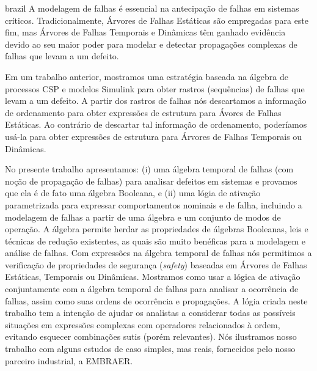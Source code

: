 \documentclass[12pt,openright,twoside,a4paper,oldfontcommands,english,brazil,final]{abntex2}
\theoremstyle{theo}
\begin{document}


\begin{resumo}[Resumo]
\begin{otherlanguage*}{brazil}
A modelagem de falhas é essencial na antecipação de falhas em sistemas críticos.
Tradicionalmente, Árvores de Falhas Estáticas são empregadas para este fim, mas Árvores de Falhas Temporais e Dinâmicas têm ganhado evidência devido ao seu maior poder para modelar e detectar propagações complexas de falhas que levam a um defeito.

Em um trabalho anterior, mostramos uma estratégia baseada na álgebra de processos CSP e modelos Simulink para obter rastros (sequências) de falhas que levam a um defeito.
A partir dos rastros de falhas nós descartamos a informação de ordenamento para obter expressões de estrutura  para Ávores de Falhas Estáticas.
Ao contrário de descartar tal informação de ordenamento, poderíamos usá-la para obter expressões de estrutura para Árvores de Falhas Temporais ou Dinâmicas.


No presente trabalho apresentamos: (i) uma álgebra temporal de falhas (com noção de propagação de falhas) para analisar defeitos em sistemas e provamos que ela é de fato uma álgebra Booleana, e (ii) uma lógia de ativação parametrizada para expressar comportamentos nominais e de falha, incluindo a modelagem de falhas a partir de uma álgebra e um conjunto de modos de operação.
A álgebra permite herdar as propriedades de álgebras Booleanas, leis e técnicas de redução existentes, as quais são muito benéficas para a modelagem e análise de falhas.
Com expressões na álgebra temporal de falhas nós permitimos a verificação de propriedades de segurança (\emph{safety}) baseadas em Árvores de Falhas Estáticas, Temporais ou Dinâmicas.
Mostramos como usar a lógica de ativação conjuntamente com a álgebra temporal de falhas para analisar a ocorrência de falhas, assim como suas ordens de ocorrência e propagações.
A lógia criada neste trabalho tem a intenção de ajudar os analistas a considerar todas as possíveis situações em expressões complexas com operadores relacionados à ordem, evitando esquecer combinações sutis (porém relevantes).
Nós ilustramos nosso trabalho com alguns estudos de caso simples, mas reais, fornecidos pelo nosso parceiro industrial, a EMBRAER.


\end{otherlanguage*}
\end{resumo}
\end{document}
